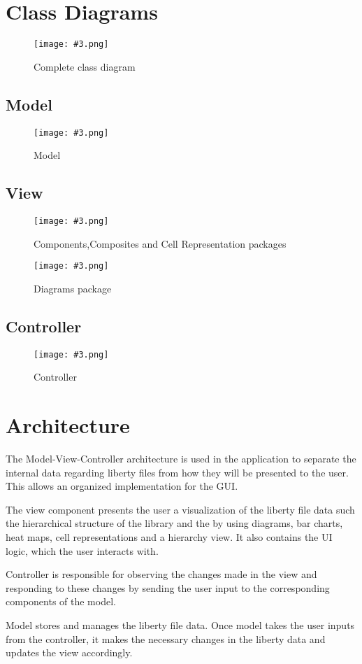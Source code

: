 \documentclass[10pt,a4paper]{report}
\newcommand{\includeimage}[5]{
    \begin{figure}[H]
        #1
        \texttt{[image: \#3.png]}
        \caption{#4}
        \label{fig:#5}
    \end{figure}
}
\begin{document}
\chapter{Class Diagrams}
\includeimage{}{0.025}{ClassDiagram}{Complete class diagram}{ClassDiagram}
\section{Model}
\includeimage{}{0.1}{Model}{Model}{ModelSecond}
\section{View}
\includeimage{}{0.15}{View_Cell_Comp}{Components,Composites and Cell Representation packages}{View_Cell_Comp}
\includeimage{}{0.04}{View_Diagrams}{Diagrams package}{View_Diagrams}
\section{Controller}
\includeimage{}{0.062}{Controllerv}{Controller}{ControllerSecond}
\chapter{Architecture}{
The Model-View-Controller architecture is used in the application to separate the internal data regarding liberty files
from how they will be presented to the user. This allows an organized implementation for the GUI.\newline

The view component presents the user a visualization of the liberty file data
such the hierarchical structure of the library and the by using diagrams, bar charts, heat maps, cell representations and a hierarchy view.
It also contains the UI logic, which the user interacts with.\newline 

Controller is responsible for observing the changes made in the view and responding to these changes by sending 
the user input to the corresponding components of the model. \newline

Model stores and manages the liberty file data. Once model takes the user inputs from the controller, it makes the necessary changes
in the liberty data and updates the view accordingly.\newline}
\end{document}
